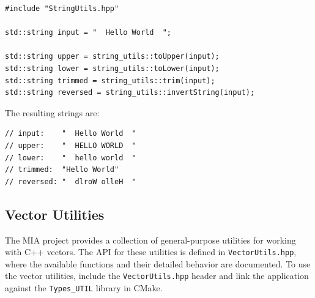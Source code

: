 \begin{lstlisting}[style=cppstyle]
#include "StringUtils.hpp"

std::string input = "  Hello World  ";

std::string upper = string_utils::toUpper(input);
std::string lower = string_utils::toLower(input);
std::string trimmed = string_utils::trim(input);
std::string reversed = string_utils::invertString(input);
\end{lstlisting}
The resulting strings are:
\begin{lstlisting}[style=cppstyle]
// input:    "  Hello World  "
// upper:    "  HELLO WORLD  "
// lower:    "  hello world  "
// trimmed:  "Hello World"
// reversed: "  dlroW olleH  "
\end{lstlisting}




\subsection{Vector Utilities}

The MIA project provides a collection of general-purpose utilities for working with C++ vectors. The API for these utilities is defined in \texttt{VectorUtils.hpp}, where the available functions and their detailed behavior are documented. To use the vector utilities, include the \texttt{VectorUtils.hpp} header and link the application against the \texttt{Types\_UTIL} library in CMake.
